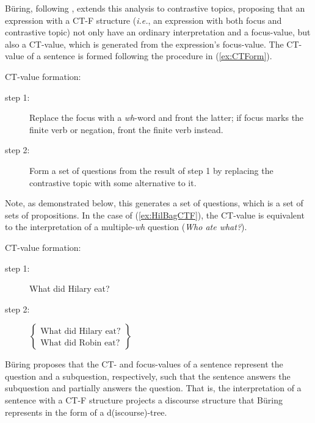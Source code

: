 \documentclass[
	letterpaper,
]{article}
\begin{document}
B\"uring, following \textcite{roberts2012information}, extends this analysis to contrastive topics, proposing that an expression with a CT-F structure (\textit{i.e.}, an expression with both focus and contrastive topic) not only have an ordinary interpretation and a focus-value, but also a CT-value, which is generated from the expression's focus-value.
The CT-value of a sentence is formed following the procedure in (\ref{ex:CTForm}).
\begin{exe}
	\ex CT-value formation:\label{ex:CTForm}
	\begin{description}
		\item[step 1:] Replace the focus with a \textit{wh}-word and front the latter; if focus marks the finite verb or negation, front the finite verb instead.
		\item[step 2:] Form a set of questions from the result of step 1 by replacing the contrastive topic with some alternative to it.\hfill\parencite{buring2003d}
	\end{description}
\end{exe}
Note, as demonstrated below, this generates a set of questions, which is a set of sets of propositions.
In the case of (\ref{ex:HilBagCTF}), the CT-value is  equivalent to the interpretation of a multiple-\textit{wh} question (\textit{Who ate what?}).
\begin{exe}
	\ex
	\begin{xlist}
		\ex CT-value formation:
		\begin{description}
			\item[step 1: ] What did Hilary eat?
			\item[step 2: ] $
				\begin{Bmatrix}
					\text{What did Hilary eat?}\\
					\text{What did Robin eat?}
				\end{Bmatrix}$
		\end{description}
	\end{xlist}
\end{exe}
B\"uring proposes that the CT- and focus-values of a sentence represent the question and a subquestion, respectively, such that the sentence answers the subquestion and partially answers the question.
That is, the interpretation of a sentence with a CT-F structure projects a discourse structure that B\"uring represents in the form of a d(iscourse)-tree.
\end{document}

